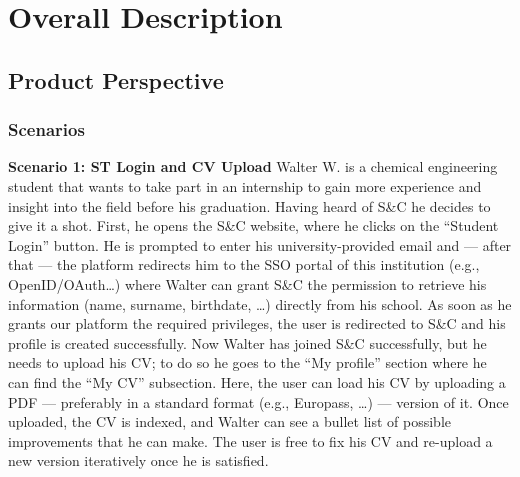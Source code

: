 \chapter{Overall Description}
\label{chap:overall_description}%

\section{Product Perspective}
\label{sec:product_perspective}%

\subsection{Scenarios}
\label{sub:scenarios}%

\par{\textbf{Scenario 1: ST Login and CV Upload}} Walter W. is a chemical engineering student that wants to take part in an
internship to gain more experience and insight into the field before his graduation. Having heard of S\&C he decides to
give it a shot. First, he opens the S\&C website, where he clicks on the “Student Login” button. He is prompted to enter
his university-provided email and — after that — the platform redirects him to the SSO portal of this institution
(e.g., OpenID/OAuth…) where Walter can grant S\&C the permission to retrieve his information
(name, surname, birthdate, …) directly from his school. As soon as he grants our platform the required privileges, the
user is redirected to S\&C and his profile is created successfully. Now Walter has joined S\&C successfully, but he needs
to upload his CV; to do so he goes to the “My profile” section where he can find the “My CV” subsection. Here, the user
can load his CV by uploading a PDF — preferably in a standard format (e.g., Europass, …) — version of it. Once uploaded,
the CV is indexed, and Walter can see a bullet list of possible improvements that he can make. The user is free to fix
his CV and re-upload a new version iteratively once he is satisfied.

